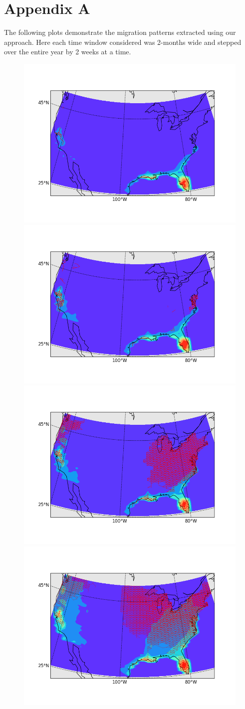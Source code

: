 \documentclass{article} %
\begin{document}
\section{Appendix A}\label{appendicks}
The following plots demonstrate the migration patterns extracted using our approach.
Here each time window considered was 2-months wide and stepped over the entire year by 2 weeks at a time.
 \begin{figure}\vspace{-20pt}
\includegraphics[width =.5 \textwidth ]{../code/swallowpics/bird0.png}\vspace{-20pt}
\includegraphics[width =.5 \textwidth ]{../code/swallowpics/bird2.png} \vspace{-20pt}
\includegraphics[width =.5 \textwidth ]{../code/swallowpics/bird4.png}
\includegraphics[width =.5 \textwidth ]{../code/swallowpics/bird6.png} \vspace{-20pt}

\end{figure}
\end{document}
